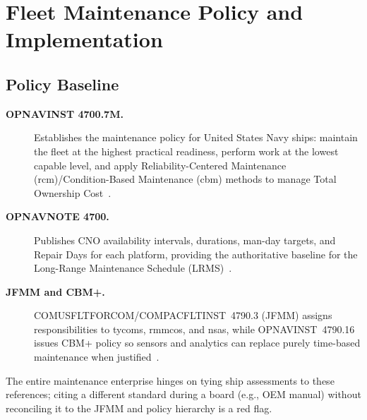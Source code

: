 \documentclass[../main.tex]{subfiles}
\begin{document}
\section{Fleet Maintenance Policy and Implementation}
\minibib

\subsection{Policy Baseline}
\begin{description}
\item[\textbf{OPNAVINST 4700.7M.}] Establishes the maintenance policy for United States Navy ships: maintain the fleet at the highest practical readiness, perform work at the lowest capable level, and apply Reliability-Centered Maintenance (\ac{rcm})/Condition-Based Maintenance (\ac{cbm}) methods to manage Total Ownership Cost~\autocite{OPNAVINST4700-7M}.
\item[\textbf{OPNAVNOTE 4700.}] Publishes CNO availability intervals, durations, man-day targets, and Repair Days for each platform, providing the authoritative baseline for the Long-Range Maintenance Schedule (LRMS)~\autocite{OPNAVNOTE4700-24}.
\item[\textbf{JFMM and CBM+.}] COMUSFLTFORCOM/COMPACFLTINST~4790.3 (JFMM) assigns responsibilities to \ac{tycom}s, \ac{rmmco}s, and \ac{nsa}s, while OPNAVINST~4790.16 issues CBM+ policy so sensors and analytics can replace purely time-based maintenance when justified~\autocite{COMFLTFORCOMINST4790-3,OPNAVINST4790-16G}.
\end{description}
The entire maintenance enterprise hinges on tying ship assessments to these references; citing a different standard during a board (e.g., OEM manual) without reconciling it to the JFMM and policy hierarchy is a red flag.
\end{document}
